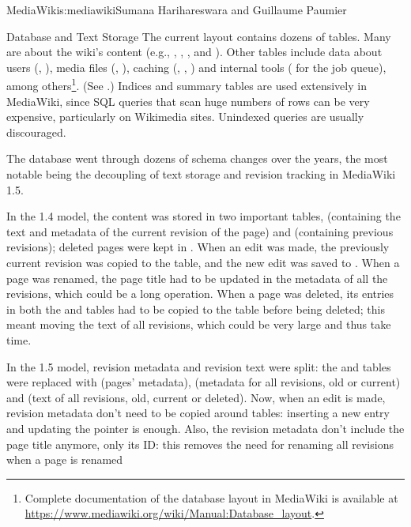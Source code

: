 \begin{aosachapter}{MediaWiki}{s:mediawiki}{Sumana Harihareswara and Guillaume Paumier}
\begin{aosasect1}{Database and Text Storage}
The current layout contains dozens of tables. Many are about the
wiki's content (e.g., , , ,
and ). Other tables include data about users
(, ), media files (,
), caching (, ,
) and internal tools ( for the job queue),
among others\footnote{Complete documentation of the database layout in
  MediaWiki is available at
  \url{https://www.mediawiki.org/wiki/Manual:Database_layout}.}. (See
.) Indices
and summary tables are used extensively in MediaWiki, since SQL
queries that scan huge numbers of rows can be very expensive,
particularly on Wikimedia sites. Unindexed queries are usually
discouraged.

The database went through dozens of schema changes over the years, the
most notable being the decoupling of text storage and revision
tracking in MediaWiki 1.5.


In the 1.4 model, the content was stored in two important tables,
 (containing the text and metadata of the current revision
of the page) and  (containing previous revisions); deleted
pages were kept in . When an edit was made, the
previously current revision was copied to the  table, and
the new edit was saved to . When a page was renamed, the
page title had to be updated in the metadata of all the 
revisions, which could be a long operation. When a page was deleted,
its entries in both the  and  tables had to be
copied to the  table before being deleted; this meant
moving the text of all revisions, which could be very large and thus
take time.

In the 1.5 model, revision metadata and revision text were split: the
 and  tables were replaced with  (pages'
metadata),  (metadata for all revisions, old or
current) and  (text of all revisions, old, current or
deleted). Now, when an edit is made, revision metadata don't need to
be copied around tables: inserting a new entry and updating the
 pointer is enough. Also, the revision metadata
don't include the page title anymore, only its ID: this removes the
need for renaming all revisions when a page is renamed


\end{aosasect1}
\end{aosachapter}
